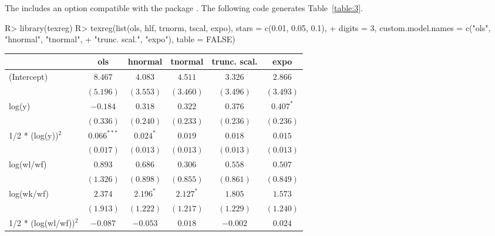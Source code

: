 \documentclass[nojss]{jss}
\begin{document}
The  includes an  option compatible with the 
 package \citep{texreg13}. The following code generates Table~\ref{table:3}.

\begin{Schunk}
\begin{Sinput}
R> library(texreg)
R> texreg(list(ols, hlf, trnorm, tscal, expo), stars = c(0.01, 0.05, 0.1), 
+         digits = 3, custom.model.names = c("ols", "hnormal", "tnormal", 
+        "trunc. scal.", "expo"), table = FALSE)
\end{Sinput}
\end{Schunk}

\begin{table}
\centering
\begin{adjustbox}{width=1\textwidth}
\small
\begin{tabular}{l c c c c c}
\hline
 & ols & hnormal & tnormal & trunc. scal. & expo \\
\hline
(Intercept)             & $8.467$       & $4.083$        & $4.511$        & $3.326$        & $2.866$        \\
                        & $(5.196)$     & $(3.553)$      & $(3.460)$      & $(3.496)$      & $(3.493)$      \\
log(y)                  & $-0.184$      & $0.318$        & $0.322$        & $0.376$        & $0.407^{*}$    \\
                        & $(0.336)$     & $(0.240)$      & $(0.233)$      & $(0.236)$      & $(0.236)$      \\
1/2 * (log(y))$^2$      & $0.066^{***}$ & $0.024^{*}$    & $0.019$        & $0.018$        & $0.015$        \\
                        & $(0.017)$     & $(0.013)$      & $(0.013)$      & $(0.013)$      & $(0.013)$      \\
log(wl/wf)              & $0.893$       & $0.686$        & $0.306$        & $0.558$        & $0.507$        \\
                        & $(1.326)$     & $(0.898)$      & $(0.855)$      & $(0.861)$      & $(0.849)$      \\
log(wk/wf)              & $2.374$       & $2.196^{*}$    & $2.127^{*}$    & $1.805$        & $1.573$        \\
                        & $(1.913)$     & $(1.222)$      & $(1.217)$      & $(1.229)$      & $(1.240)$      \\
1/2 * (log(wl/wf))$^2$  & $-0.087$      & $-0.053$       & $0.018$        & $-0.002$       & $0.024$        \\

\end{tabular}
\end{adjustbox}
\end{table}
\end{document}
